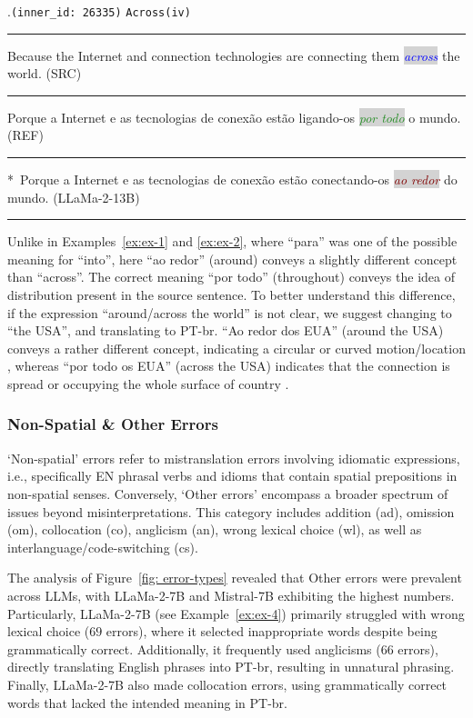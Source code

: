 \ex.\texttt{(inner\_id: 26335)} \hfill \texttt{Across(iv)} \\[0.3ex] 
\noindent\rule{\linewidth}{0.9pt}
Because the Internet and connection technologies are connecting them \colorbox{lightgray}{\emph{\textcolor{blue}{across}}} the world. (SRC)\label{ex:ex-3} \\[-0.3ex] 
\noindent\rule{\linewidth}{0.3pt}
Porque a Internet e as tecnologias de conexão estão ligando-os \colorbox{lightgray}{\emph{\textcolor{ForestGreen}{por todo}}} o mundo. (REF) \\[-0.3ex]
\noindent\rule{\linewidth}{0.3pt}
*~Porque a Internet e as tecnologias de conexão estão conectando-os \colorbox{lightgray}{\emph{\textcolor{Maroon}{ao redor}}} do mundo. (LLaMa-2-13B) \\[-0.3ex] 
\noindent\rule{\linewidth}{0.9pt}

Unlike in Examples~\ref{ex:ex-1} and \ref{ex:ex-2}, where ``para'' was one of the possible meaning for ``into'', here ``ao redor'' (around) conveys a slightly different concept than ``across''. The correct meaning ``por todo'' (throughout) conveys the idea of distribution present in the source sentence. To better understand this difference, if the expression ``around/across the world'' is not clear, we suggest changing to ``the USA'', and translating to PT-br. ``Ao redor dos EUA'' (around the USA) conveys a rather different concept, indicating a circular or curved motion/location \parencite{dicioRedor}, whereas ``por todo os EUA'' (across the USA) indicates that the connection is spread or occupying the whole surface of country \parencite{bruckfield2011prepositions}. 


\subsubsection{Non-Spatial \& Other Errors}

`Non-spatial' errors refer to mistranslation errors involving idiomatic expressions, i.e., specifically EN phrasal verbs and idioms that contain spatial prepositions in non-spatial senses. Conversely, `Other errors' encompass a broader spectrum of issues beyond misinterpretations. This category includes addition (ad), omission (om), collocation (co), anglicism (an), wrong lexical choice (wl), as well as interlanguage/code-switching (cs).

The analysis of Figure~\ref{fig: error-types} revealed that Other errors were prevalent across LLMs, with LLaMa-2-7B and Mistral-7B exhibiting the highest numbers. Particularly, LLaMa-2-7B (see Example~\ref{ex:ex-4}) primarily struggled with wrong lexical choice ($69$ errors), where it selected inappropriate words despite being grammatically correct. Additionally, it frequently used anglicisms ($66$ errors), directly translating English phrases into  PT-br, resulting in unnatural phrasing. Finally, LLaMa-2-7B also made collocation errors, using grammatically correct words that lacked the intended meaning in PT-br.

